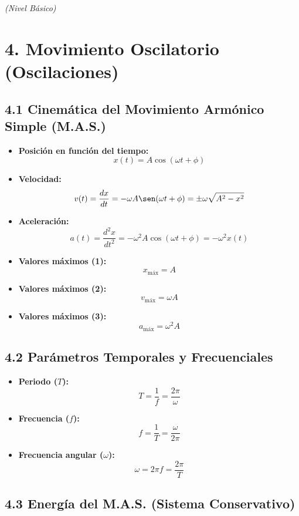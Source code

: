 \documentclass[11pt,a4paper]{article}
\begin{document}
\textit{(Nivel Básico)}

\section*{4. Movimiento Oscilatorio (Oscilaciones)}

\subsection*{4.1 Cinemática del Movimiento Armónico Simple (M.A.S.)}

\begin{itemize}
  \item \textbf{Posición en función del tiempo:}
  \[
    x(t) = A \cos(\omega t + \phi)
  \]
  \item \textbf{Velocidad:}
  \[
    v(t) = \frac{dx}{dt} = -\omega A \sen(\omega t + \phi) = \pm \omega \sqrt{A^2 - x^2}
  \]
  \item \textbf{Aceleración:}
  \[
    a(t) = \frac{d^2x}{dt^2} = -\omega^2 A \cos(\omega t + \phi) = -\omega^2 x(t)
  \]
  \item \textbf{Valores máximos (1):}
  \[
    x_{\mathrm{máx}} = A
  \]
  \item \textbf{Valores máximos (2):}
  \[
    v_{\mathrm{máx}} = \omega A
  \]
  \item \textbf{Valores máximos (3):}
  \[
    a_{\mathrm{máx}} = \omega^2 A
  \]
\end{itemize}

\subsection*{4.2 Parámetros Temporales y Frecuenciales}

\begin{itemize}
  \item \textbf{Periodo ($T$):}
  \[
    T = \frac{1}{f} = \frac{2\pi}{\omega}
  \]
  \item \textbf{Frecuencia ($f$):}
  \[
    f = \frac{1}{T} = \frac{\omega}{2\pi}
  \]
  \item \textbf{Frecuencia angular ($\omega$):}
  \[
    \omega = 2\pi f = \frac{2\pi}{T}
  \]
\end{itemize}

\subsection*{4.3 Energía del M.A.S. (Sistema Conservativo)}
\end{document}
